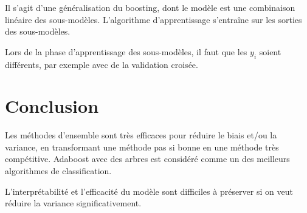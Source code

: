 	Il s'agit d'une généralisation du boosting, dont le modèle est une combinaison linéaire des sous-modèles. L'algorithme d'apprentissage s'entraîne sur les sorties des sous-modèles.
	
	
	Lors de la phase d'apprentissage des sous-modèles, il faut que les $y_i$ soient différents, par exemple avec de la validation croisée.
	
	
\section{Conclusion}

Les méthodes d'ensemble sont très efficaces pour réduire le biais et/ou la variance, en transformant une méthode pas si bonne en une méthode très compétitive. Adaboost avec des arbres est considéré comme un des meilleurs algorithmes de classification.

L'interprétabilité et l'efficacité du modèle sont difficiles à préserver si on veut réduire la variance significativement.
